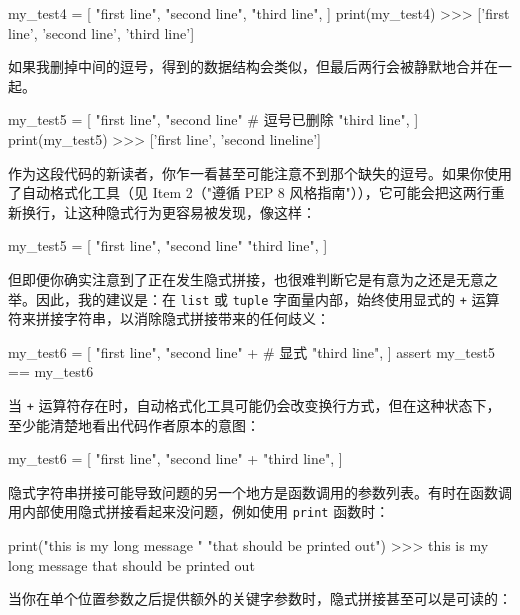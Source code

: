 \begin{codebox}[python]
my_test4 = [
    "first line\n",
    "second line\n",
    "third line\n",
]
print(my_test4)
>>>
['first line\n', 'second line\n', 'third line\n']
\end{codebox}

如果我删掉中间的逗号，得到的数据结构会类似，但最后两行会被静默地合并在一起。

\begin{codebox}[python]
my_test5 = [
    "first line\n",
    "second line\n"  # 逗号已删除
    "third line\n",
]
print(my_test5)
>>>
['first line\n', 'second line\nthird line\n']
\end{codebox}

作为这段代码的新读者，你乍一看甚至可能注意不到那个缺失的逗号。如果你使用了自动格式化工具（见 Item 2（"遵循 PEP 8 风格指南"）），它可能会把这两行重新换行，让这种隐式行为更容易被发现，像这样：

\begin{codebox}[python]
my_test5 = [
    "first line\n",
    "second line\n" "third line\n",
]
\end{codebox}

但即便你确实注意到了正在发生隐式拼接，也很难判断它是有意为之还是无意之举。因此，我的建议是：在 \texttt{list} 或 \texttt{tuple} 字面量内部，始终使用显式的 \texttt{+} 运算符来拼接字符串，以消除隐式拼接带来的任何歧义：

\begin{codebox}[python]
my_test6 = [
    "first line\n",
    "second line\n" +  # 显式
    "third line\n",
]
assert my_test5 == my_test6
\end{codebox}

当 \texttt{+} 运算符存在时，自动格式化工具可能仍会改变换行方式，但在这种状态下，至少能清楚地看出代码作者原本的意图：

\begin{codebox}[python]
my_test6 = [
    "first line\n",
    "second line\n" + "third line\n",
]
\end{codebox}

隐式字符串拼接可能导致问题的另一个地方是函数调用的参数列表。有时在函数调用内部使用隐式拼接看起来没问题，例如使用 \texttt{print} 函数时：

\begin{codebox}[python]
print("this is my long message "
      "that should be printed out")
>>>
this is my long message that should be printed out
\end{codebox}

当你在单个位置参数之后提供额外的关键字参数时，隐式拼接甚至可以是可读的：

